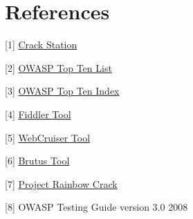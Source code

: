 \clearpage
\section{References}

[1] \href{https://crackstation.net/}{Crack Station}

[2] \href{https://www.owasp.org/index.php/Category:OWASP_Top_Ten_2013_Project}{OWASP Top Ten List}

[3] \href{https://www.owasp.org/index.php/OWASP_Source_Code_Flaws_Top_10_Project_Index}{OWASP Top Ten Index}

[4] \href{http://fiddler2.com/}{Fiddler Tool}

[5] \href{http://sec4app.com/}{WebCruiser Tool}

[6] \href{http://www.hoobie.net/brutus/}{Brutus Tool}

[7] \href{http://project-rainbowcrack.com/}{Project Rainbow Crack}

[8] OWASP Testing Guide version 3.0 2008